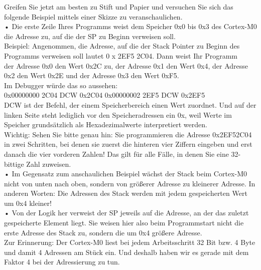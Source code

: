 Greifen Sie jetzt am besten zu Stift und Papier und versuchen Sie sich das folgende Beispiel mittels einer Skizze zu veranschaulichen.\\

•	Die erste Zeile Ihres Programms weist dem Speicher 0x0 bis 0x3 des Cortex-M0 die Adresse zu, auf die der SP zu Beginn verweisen soll.\\

Beispiel: Angenommen, die Adresse, auf die der Stack Pointer zu Beginn des Programms verweisen soll lautet 0 x 2EF5 2C04. Dann weist Ihr Programm \\


der Adresse 0x0 den Wert 0x2C zu, 
der Adresse 0x1 den Wert 0x4, 
der Adresse 0x2 den Wert 0x2E und 
der Adresse 0x3 den Wert 0xF5.\\


Im Debugger würde das so aussehen:\\
 

0x00000000	2C04		DCW		0x2C04
0x00000002	2EF5		DCW		0x2EF5\\


DCW ist der Befehl, der einem Speicherbereich einen Wert zuordnet. Und auf der linken Seite steht lediglich vor den Speicheradressen ein 0x, weil Werte im Speicher grundsätzlich als Hexadezimalwerte interpretiert werden.\\

Wichtig: Sehen Sie bitte genau hin: Sie programmieren die Adresse 0x2EF52C04 in zwei Schritten, bei denen sie zuerst die hinteren vier Ziffern eingeben und erst danach die vier vorderen Zahlen! Das gilt für alle Fälle, in denen Sie eine 32-bittige Zahl zuweisen.\\

•	Im Gegensatz zum anschaulichen Beispiel wächst der Stack beim Cortex-M0 nicht von unten nach oben, sondern von größerer Adresse zu kleinerer Adresse. In anderen Worten: Die Adressen des Stack werden mit jedem gespeicherten Wert um 0x4 kleiner!\\

•	Von der Logik her verweist der SP jeweils auf die Adresse, an der das zuletzt gespeicherte Element liegt. Sie weisen hier also beim Programmstart nicht die erste Adresse des Stack zu, sondern die um 0x4 größere Adresse. \\

Zur Erinnerung: Der Cortex-M0 liest bei jedem Arbeitsschritt 32 Bit bzw. 4 Byte und damit 4 Adressen am Stück ein. Und deshalb haben wir es gerade mit dem Faktor 4 bei der Adressierung zu tun.\\

